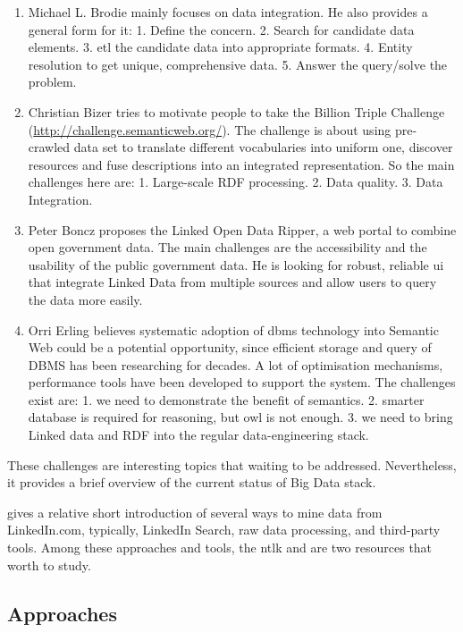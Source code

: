 	\begin{enumerate}
	\item
	Michael L. Brodie mainly focuses on data integration. He also provides a general form for it: 1. Define the concern. 2. Search for candidate data elements. 3. \gls{etl} the candidate data into appropriate formats. 4. Entity resolution to get unique, comprehensive data. 5. Answer the query/solve the problem. 
	\item
	Christian Bizer tries to motivate people to take the Billion Triple Challenge (\url{http://challenge.semanticweb.org/}). The challenge is about using pre-crawled data set to translate different vocabularies into uniform one, discover resources and fuse descriptions into an integrated representation. So the main challenges here are: 1. Large-scale RDF processing. 2. Data quality. 3. Data Integration. 
	\item
	Peter Boncz proposes the Linked Open Data Ripper, a web portal to combine open government data. The main challenges are the accessibility and the usability of  the public government data. He is looking for robust, reliable \gls{ui} that integrate Linked Data from multiple sources and allow users to query the data more easily.  
	\item
	Orri Erling believes systematic adoption of \gls{dbms} technology into Semantic Web could be a potential opportunity, since efficient storage and query of DBMS has been researching for decades. A lot of optimisation mechanisms, performance tools have been developed to support the system. The challenges exist are: 1. we need to demonstrate the benefit of semantics. 2. smarter database is required for reasoning, but \gls{owl} is not enough. 3. we need to bring Linked data and RDF into the regular data-engineering stack.
	\end{enumerate}
  
These challenges are interesting topics that waiting to be addressed. Nevertheless, it provides a brief overview of the current status of Big Data stack.


\cite{bradbury2011} gives a relative short introduction of several ways to mine data from LinkedIn.com, typically, LinkedIn Search, raw data processing, and third-party tools. Among these approaches and tools, the \gls{ntlk} and \cite{russell2011} are two resources that worth to study.

\subsection{Approaches}

